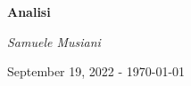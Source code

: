 \thispagestyle{empty}

\begin{center}
	\vfill
    \vspace*{0.3\textheight}

	\Huge
	\textbf{Analisi}
	
	\vspace{1cm}
	
	\Large
	\textit{Samuele Musiani}
	
	\vspace{3cm}
	
	\large
	September 19, 2022 - \today
	
    \normalsize
    
\end{center}
